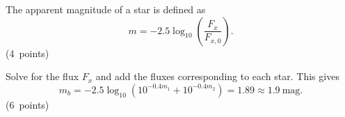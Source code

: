 The apparent magnitude of a star is defined as
\[
m=-2.5\log_{10}\left(\frac{F_x}{F_{x,0}}\right).
\]
\hfill\mbox{(4 points)}

Solve for the flux $F_x$ and add the fluxes corresponding to each star. This gives
\[
m_b=-2.5\log_{10}\left(10^{-0.4m_1}+10^{-0.4m_2}\right)=1.89\approx1.9\ \mathrm{mag}.
\]
\hfill\mbox{(6 points)}
